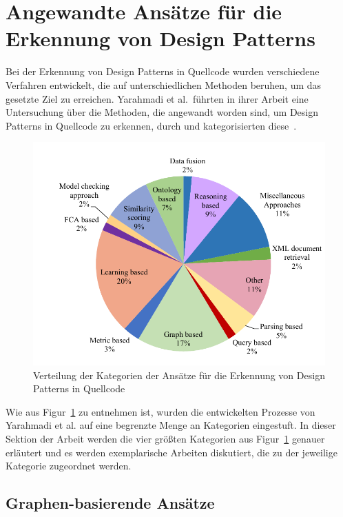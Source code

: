 \section{Angewandte Ansätze für die Erkennung von Design Patterns}

Bei der Erkennung von Design Patterns in Quellcode wurden verschiedene Verfahren entwickelt, die auf unterschiedlichen Methoden beruhen, um das gesetzte Ziel zu erreichen.
Yarahmadi et al.~führten in ihrer Arbeit eine Untersuchung über die Methoden, die angewandt worden sind, um Design Patterns in Quellcode zu erkennen, durch und kategorisierten diese~\cite[S. 5805]{yarahmadi2020design}.

\begin{figure}[h]
    \centering
    \includegraphics[scale=0.5]{figures/approches_distribution.png}
    \caption{Verteilung der Kategorien der Ansätze für die Erkennung von Design Patterns in Quellcode}
    \label{fig:approach_dist}
\end{figure}

Wie aus Figur~\ref{fig:approach_dist} zu entnehmen ist, wurden die entwickelten Prozesse von Yarahmadi et al. auf eine begrenzte Menge an Kategorien eingestuft.
In dieser Sektion der Arbeit werden die vier größten Kategorien aus Figur~\ref{fig:approach_dist} genauer erläutert und es werden exemplarische Arbeiten diskutiert, die zu der jeweilige Kategorie zugeordnet werden.

\subsection{Graphen-basierende Ansätze}


